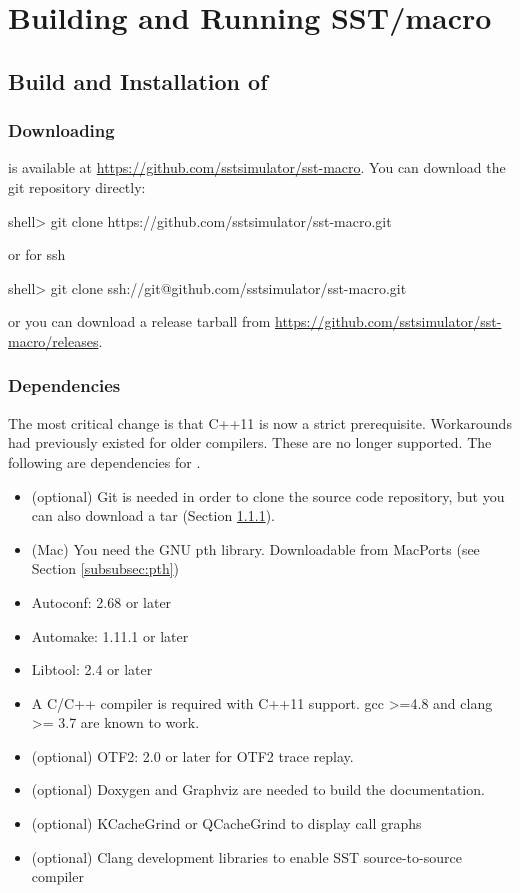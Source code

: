 
\chapter{Building and Running SST/macro}
\label{chapter:building}

\section{Build and Installation of \sstmacro}
\label{sec:buildinstall}


\subsection{Downloading}
\label{subsec:build:downloading}

\sstmacro is available at \url{https://github.com/sstsimulator/sst-macro}.
You can download the git repository directly:

\begin{ShellCmd}
shell> git clone https://github.com/sstsimulator/sst-macro.git 
\end{ShellCmd}
or for ssh

\begin{ShellCmd}
shell> git clone ssh://git@github.com/sstsimulator/sst-macro.git 
\end{ShellCmd}
or you can download a release tarball from \url{https://github.com/sstsimulator/sst-macro/releases}.

\subsection{Dependencies}
\label{subsec:build:dependencies}
The most critical change is that C++11 is now a strict prerequisite. 
Workarounds had previously existed for older compilers. 
These are no longer supported.
The following are dependencies for \sstmacro.

\begin{itemize}
\item (optional) Git is needed in order to clone the source code repository, but you can also download a tar (Section \ref{subsec:build:downloading}).
\item (Mac) You need the GNU pth library. Downloadable from MacPorts (see Section \ref{subsubsec:pth})
\item Autoconf: 2.68 or later 
\item Automake: 1.11.1 or later 
\item Libtool: 2.4 or later 
\item A C/C++ compiler is required with C++11 support.  gcc >=4.8 and clang >= 3.7 are known to work.
\item (optional) OTF2: 2.0 or later for OTF2 trace replay.
\item (optional) Doxygen and Graphviz are needed to build the documentation.
\item (optional) KCacheGrind or QCacheGrind to display call graphs
\item (optional) Clang development libraries to enable SST source-to-source compiler
\end{itemize}

